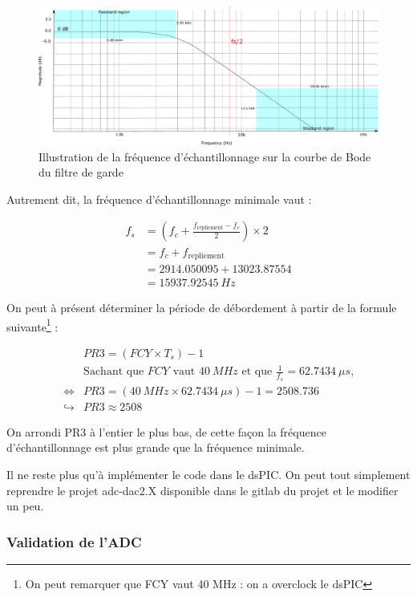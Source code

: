 \begin{figure}[H]
    \centering
    \includegraphics[width=1\textwidth]{pdffiles/lowpassspecINK.pdf}
    \caption{Illustration de la fréquence d'échantillonnage sur la courbe de Bode du filtre de garde}
    \label{fig:fs}
\end{figure}


Autrement dit, la fréquence d'échantillonnage minimale vaut :

\begin{align*}
    f_s &=\left(f_c+ \frac{f_{\text{repliement}}-f_c}{2}\right) \times 2 \\
    &= f_c + f_{\text{repliement}} \\
    &= 2914.050095+13023.87554 \\
    &= 15937.92545 \ Hz
\end{align*}

On peut à présent déterminer la période de débordement à partir de la formule suivante\footnote{On peut remarquer que FCY vaut 40 MHz : on a overclock le dsPIC} :

\begin{align*}
    & PR3 = (FCY \times T_s) - 1 \\
    & \text{Sachant que $FCY$ vaut $40 \ MHz$ et que $\frac{1}{f_s}=62.7434 \ \mu s$,} \\
   \iff & PR3=(40 \ MHz \times 62.7434 \ \mu s) -1 =2508.736 \\
   \hookrightarrow & PR3 \approx 2508 
\end{align*}

On arrondi PR3 à l'entier le plus bas, de cette façon la fréquence d'échantillonnage est plus grande que la fréquence minimale.

Il ne reste plus qu'à implémenter le code dans le dsPIC. On peut tout simplement reprendre le projet adc-dac2.X disponible dans le gitlab du projet et le modifier un peu.

\subsubsection{Validation de l'ADC}

